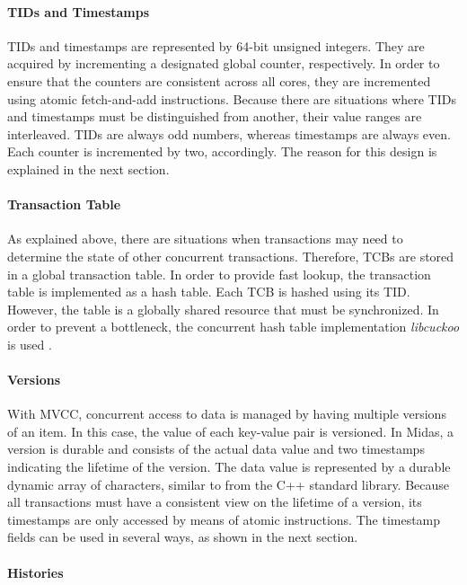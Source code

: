 \paragraph{TIDs and Timestamps}

TIDs and timestamps are represented by 64-bit unsigned integers. They are acquired by incrementing a designated global counter, respectively. In order to ensure that the counters are consistent across all cores, they are incremented using atomic fetch-and-add instructions. Because there are situations where TIDs and timestamps must be distinguished from another, their value ranges are interleaved. TIDs are always odd numbers, whereas timestamps are always even. Each counter is incremented by two, accordingly. The reason for this design is explained in the next section.

\paragraph{Transaction Table}

As explained above, there are situations when transactions may need to determine the state of other concurrent transactions. Therefore, TCBs are stored in a global transaction table. In order to provide fast lookup, the transaction table is implemented as a hash table. Each TCB is hashed using its TID. However, the table is a globally shared resource that must be synchronized. In order to prevent a bottleneck, the concurrent hash table implementation \emph{libcuckoo} is used \cite{fan2013memc3, li2014algorithmic, libcuckoo2018home}.

\paragraph{Versions}

With MVCC, concurrent access to data is managed by having multiple versions of an item. In this case, the value of each key-value pair is versioned. In Midas, a version is durable and consists of the actual data value and two timestamps indicating the lifetime of the version. The data value is represented by a durable dynamic array of characters, similar to  from the C++ standard library. Because all transactions must have a consistent view on the lifetime of a version, its timestamps are only accessed by means of atomic instructions. The timestamp fields can be used in several ways, as shown in the next section.

\paragraph{Histories}


